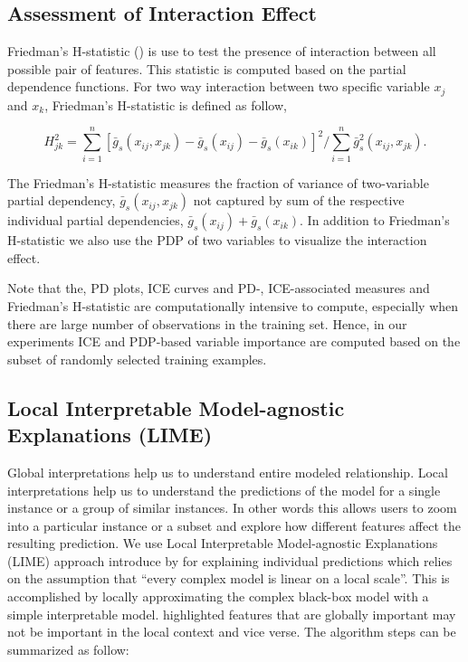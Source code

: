 \documentclass[11pt,a4paper,]{article}
\begin{document}
\subsection{Assessment of Interaction
Effect}\label{assessment-of-interaction-effect}

Friedman's H-statistic (\textcite{friedman2008predictive}) is use to
test the presence of interaction between all possible pair of features.
This statistic is computed based on the partial dependence functions.
For two way interaction between two specific variable \(x_j\) and
\(x_k\), Friedman's H-statistic is defined as follow,

\[H_{jk}^2=\sum_{i=1}^{n}[\bar{g}_{s}(x_{ij}, x_{jk})-\bar{g}_{s}(x_{ij})-\bar{g}_{s}(x_{ik})]^2/\sum_{i=1}^{n}\bar{g}^2_{s}(x_{ij}, x_{jk}).\]

The Friedman's H-statistic measures the fraction of variance of
two-variable partial dependency, \(\bar{g}_{s}(x_{ij}, x_{jk})\) not
captured by sum of the respective individual partial dependencies,
\(\bar{g}_{s}(x_{ij})+\bar{g}_{s}(x_{ik})\). In addition to Friedman's
H-statistic we also use the PDP of two variables to visualize the
interaction effect.

Note that the, PD plots, ICE curves and PD-, ICE-associated measures and
Friedman's H-statistic are computationally intensive to compute,
especially when there are large number of observations in the training
set. Hence, in our experiments ICE and PDP-based variable importance are
computed based on the subset of randomly selected training examples.

\subsection{Local Interpretable Model-agnostic Explanations
(LIME)}\label{local-interpretable-model-agnostic-explanations-lime}

Global interpretations help us to understand entire modeled
relationship. Local interpretations help us to understand the
predictions of the model for a single instance or a group of similar
instances. In other words this allows users to zoom into a particular
instance or a subset and explore how different features affect the
resulting prediction. We use Local Interpretable Model-agnostic
Explanations (LIME) approach introduce by \textcite{ribeiro2016should}
for explaining individual predictions which relies on the assumption
that ``every complex model is linear on a local scale''. This is
accomplished by locally approximating the complex black-box model with a
simple interpretable model. \textcite{ribeiro2016should} highlighted
features that are globally important may not be important in the local
context and vice verse. The algorithm steps can be summarized as follow:
\end{document}
